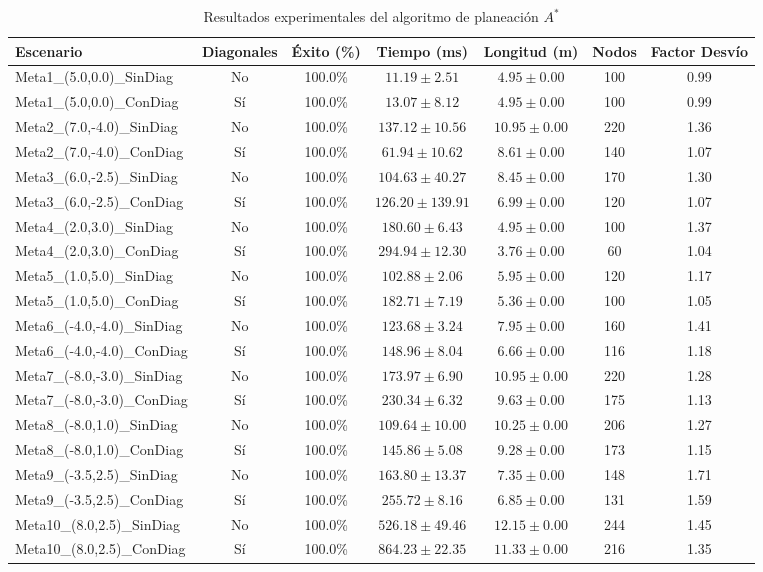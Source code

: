\begin{table}[htbp]
\centering
\caption{Resultados experimentales del algoritmo de planeación $A^*$}
\label{tab:a_star_results}
\begin{tabular}{lcccccc}
\hline
\textbf{Escenario} & \textbf{Diagonales} & \textbf{Éxito (\%)} & \textbf{Tiempo (ms)} & \textbf{Longitud (m)} & \textbf{Nodos} & \textbf{Factor Desvío} \\
\hline
Meta1\_(5.0,0.0)\_SinDiag & No & 100.0\% & $11.19 \pm 2.51$ & $4.95 \pm 0.00$ & 100 & 0.99 \\
Meta1\_(5.0,0.0)\_ConDiag & Sí & 100.0\% & $13.07 \pm 8.12$ & $4.95 \pm 0.00$ & 100 & 0.99 \\
Meta2\_(7.0,-4.0)\_SinDiag & No & 100.0\% & $137.12 \pm 10.56$ & $10.95 \pm 0.00$ & 220 & 1.36 \\
Meta2\_(7.0,-4.0)\_ConDiag & Sí & 100.0\% & $61.94 \pm 10.62$ & $8.61 \pm 0.00$ & 140 & 1.07 \\
Meta3\_(6.0,-2.5)\_SinDiag & No & 100.0\% & $104.63 \pm 40.27$ & $8.45 \pm 0.00$ & 170 & 1.30 \\
Meta3\_(6.0,-2.5)\_ConDiag & Sí & 100.0\% & $126.20 \pm 139.91$ & $6.99 \pm 0.00$ & 120 & 1.07 \\
Meta4\_(2.0,3.0)\_SinDiag & No & 100.0\% & $180.60 \pm 6.43$ & $4.95 \pm 0.00$ & 100 & 1.37 \\
Meta4\_(2.0,3.0)\_ConDiag & Sí & 100.0\% & $294.94 \pm 12.30$ & $3.76 \pm 0.00$ & 60 & 1.04 \\
Meta5\_(1.0,5.0)\_SinDiag & No & 100.0\% & $102.88 \pm 2.06$ & $5.95 \pm 0.00$ & 120 & 1.17 \\
Meta5\_(1.0,5.0)\_ConDiag & Sí & 100.0\% & $182.71 \pm 7.19$ & $5.36 \pm 0.00$ & 100 & 1.05 \\
Meta6\_(-4.0,-4.0)\_SinDiag & No & 100.0\% & $123.68 \pm 3.24$ & $7.95 \pm 0.00$ & 160 & 1.41 \\
Meta6\_(-4.0,-4.0)\_ConDiag & Sí & 100.0\% & $148.96 \pm 8.04$ & $6.66 \pm 0.00$ & 116 & 1.18 \\
Meta7\_(-8.0,-3.0)\_SinDiag & No & 100.0\% & $173.97 \pm 6.90$ & $10.95 \pm 0.00$ & 220 & 1.28 \\
Meta7\_(-8.0,-3.0)\_ConDiag & Sí & 100.0\% & $230.34 \pm 6.32$ & $9.63 \pm 0.00$ & 175 & 1.13 \\
Meta8\_(-8.0,1.0)\_SinDiag & No & 100.0\% & $109.64 \pm 10.00$ & $10.25 \pm 0.00$ & 206 & 1.27 \\
Meta8\_(-8.0,1.0)\_ConDiag & Sí & 100.0\% & $145.86 \pm 5.08$ & $9.28 \pm 0.00$ & 173 & 1.15 \\
Meta9\_(-3.5,2.5)\_SinDiag & No & 100.0\% & $163.80 \pm 13.37$ & $7.35 \pm 0.00$ & 148 & 1.71 \\
Meta9\_(-3.5,2.5)\_ConDiag & Sí & 100.0\% & $255.72 \pm 8.16$ & $6.85 \pm 0.00$ & 131 & 1.59 \\
Meta10\_(8.0,2.5)\_SinDiag & No & 100.0\% & $526.18 \pm 49.46$ & $12.15 \pm 0.00$ & 244 & 1.45 \\
Meta10\_(8.0,2.5)\_ConDiag & Sí & 100.0\% & $864.23 \pm 22.35$ & $11.33 \pm 0.00$ & 216 & 1.35 \\
\hline
\end{tabular}
\end{table}